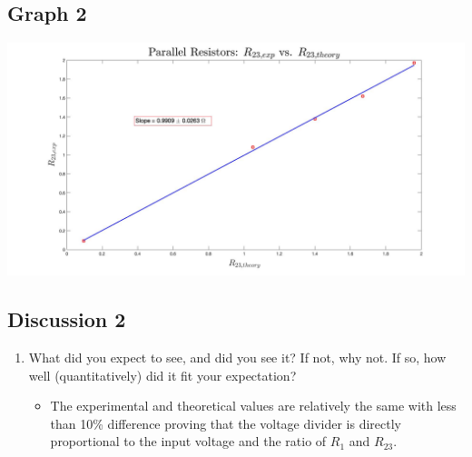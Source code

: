 \documentclass{article}
\begin{document}
\begin{table}[!htp]
\begin{center}
    \subsection*{Graph 2}
    \includegraphics[scale=0.2]{parallel.jpg}
    \subsection*{Discussion 2}
    \begin{enumerate}
      \item What did you expect to see, and did you see it? If not, why not. If so, how well (quantitatively) did it fit your expectation?
      \begin{itemize}
        \item The experimental and theoretical values are relatively the same with less than 10\% difference proving that the voltage divider is directly proportional to the input voltage and the ratio of \(R_1\) and \(R_{23}\).
      \end{itemize}
    \end{enumerate}
  \end{center}
\end{table}
\end{document}
